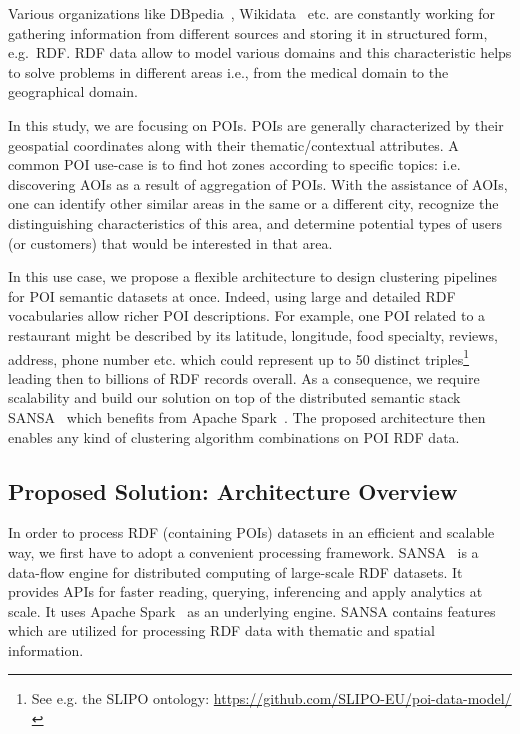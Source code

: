 Various organizations like DBpedia~\cite{dbpedia-swj}, Wikidata~\cite{Vrandecic:2014:WFC:2661061.2629489} etc. are constantly working for gathering information from different sources and storing it in structured form, e.g.~\gls{RDF}.
\gls{RDF} data allow to model various domains and this characteristic helps to solve problems in different areas i.e., from the medical domain to the geographical domain. 

In this study, we are focusing on \gls{POI}s.
\gls{POI}s are generally characterized by their geospatial coordinates along with their thematic/contextual attributes.
A common \gls{POI} use-case is to find hot zones according to specific topics: i.e. discovering \gls{AOI}s as a result of aggregation of \gls{POI}s.
With the assistance of \gls{AOI}s, one can identify other similar areas in the same or a different city, recognize the distinguishing characteristics of this area, and determine potential types of users (or customers) that would be interested in that area.

In this use case, we propose a flexible architecture to design clustering pipelines for POI semantic datasets at once.
Indeed, using large and detailed \gls{RDF} vocabularies allow richer \gls{POI} descriptions.
For example, one \gls{POI} related to a restaurant might be described by its latitude, longitude, food specialty, reviews, address, phone number etc. which could represent up to 50 distinct triples\footnote{\scriptsize See e.g. the SLIPO ontology: \url{https://github.com/SLIPO-EU/poi-data-model/}} leading then to billions of RDF records overall.
As a consequence, we require scalability and build our solution on top of the distributed semantic stack SANSA~\cite{lehmann-2017-sansa-iswc} which benefits from Apache Spark~\cite{zaharia2012resilient}.
The proposed architecture then enables any kind of clustering algorithm combinations on \gls{POI} \gls{RDF} data.

\subsection{Proposed Solution: Architecture Overview}
In order to process RDF (containing POIs) datasets in an efficient and scalable way, we first have to adopt a convenient processing framework.
SANSA~\cite{lehmann-2017-sansa-iswc} is a data-flow engine for distributed computing of large-scale \gls{RDF} datasets. 
It provides APIs for faster reading, querying, inferencing and apply analytics at scale.
It uses Apache Spark~\cite{zaharia2012resilient} as an underlying engine.
SANSA contains features which are utilized for processing \gls{RDF} data with thematic and spatial information.

